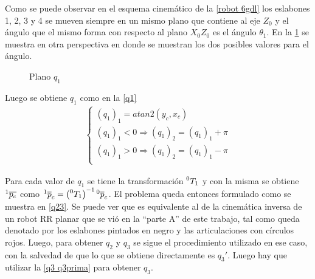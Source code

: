\documentclass[a4paper,12pt]{article}
\begin{document}
Como se puede observar en el esquema cinemático de la \cref{robot 6gdl} los eslabones
1, 2, 3 y 4 se mueven siempre en un mismo plano que contiene al eje $Z_0$ y el ángulo que
el mismo forma con respecto al plano $X_0Z_0$ es el ángulo $\theta_1$. En la \cref{plano q1} se muestra en otra perspectiva
en donde se muestran los dos posibles valores para el ángulo.

\begin{figure}[H]
    \centering
    \begin{adjustbox}{max width=\columnwidth}
    \end{adjustbox}
    \caption{Plano $q_1$}
    \label{plano q1}
\end{figure}

Luego se obtiene $q_1$ como en la \cref{q1}
\begin{align}
    \begin{cases}
        (q_1)_1 = atan2(y_c, x_c)\\
        (q_1)_1 < 0 \Rightarrow (q_1)_2 = (q_1)_1 + \pi\\
        (q_1)_1 > 0 \Rightarrow (q_1)_2 = (q_1)_1 - \pi\\
    \end{cases}
    \label{q1}
\end{align}

Para cada valor de $q_1$ se tiene la transformación
$\prescript{0}{}{T_1}$ y con la misma se obtiene $\prescript{1}{}{\overline{p_c}}$ como
$\prescript{1}{}{\overline{p}_c} = \left(\prescript{0}{}{T_1}\right)^{-1}\prescript{0}{}{\overline{p}_c}$.
El problema queda entonces formulado como se muestra en \cref{q23}. Se puede ver que  
es equivalente al de la cinemática inversa de un robot RR planar que se vió en la ``parte A'' de este trabajo, tal como 
queda denotado por los eslabones pintados en negro y las articulaciones con círculos rojos. Luego, para obtener $q_2$ y $q_3$ se sigue 
el procedimiento utilizado en ese caso, con la salvedad de que lo que se obtiene directamente es $q_3\prime$. Luego hay que utilizar la \cref{q3 q3prima} para obtener $q_3$.
\end{document}

